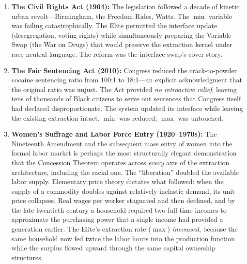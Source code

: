 \begin{enumerate}
    The theorem's temporal prediction was also confirmed: once the kinetic threat of the Depression era subsided, the material wage was gradually clawed back. By 2020, wealth concentration had returned to 1920s Gilded Age levels. The kernel recompiled.

    \item \textbf{The Civil Rights Act (1964):} The legislation followed a decade of kinetic urban revolt---Birmingham, the Freedom Rides, Watts. The $\min$ variable was failing catastrophically. The Elite permitted the interface update (desegregation, voting rights) while simultaneously preparing the Variable Swap (the War on Drugs) that would preserve the extraction kernel under race-neutral language. The reform was the interface swap's cover story.

    \item \textbf{The Fair Sentencing Act (2010):} Congress reduced the crack-to-powder cocaine sentencing ratio from 100:1 to 18:1---an explicit acknowledgment that the original ratio was unjust. The Act provided \textit{no retroactive relief}, leaving tens of thousands of Black citizens to serve out sentences that Congress itself had declared disproportionate. The system updated its interface while leaving the existing extraction intact. $\min$ was reduced; $\max$ was untouched.

    \item \textbf{Women's Suffrage and Labor Force Entry (1920--1970s):} The Nineteenth Amendment and the subsequent mass entry of women into the formal labor market is perhaps the most structurally elegant demonstration that the Concession Theorem operates across \textit{every} axis of the extraction architecture, including the racial one. The ``liberation'' doubled the available labor supply. Elementary price theory dictates what followed: when the supply of a commodity doubles against relatively inelastic demand, its unit price collapses. Real wages per worker stagnated and then declined, and by the late twentieth century a household required two full-time incomes to approximate the purchasing power that a single income had provided a generation earlier. The Elite's extraction rate ($\max$) \textit{increased}, because the same household now fed twice the labor hours into the production function while the surplus flowed upward through the same capital ownership structures.


\end{enumerate}
